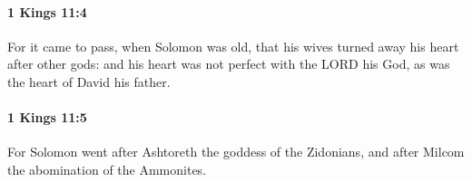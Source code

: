 		\paragraph{1 Kings 11:4} %
			\label{1KINGS-11-4}

			For it came to pass, when Solomon was old, that his wives turned away his heart after other gods: and his heart was not perfect with the LORD his God, as was the heart of David his father.


		\paragraph{1 Kings 11:5} %
			\label{1KINGS-11-5}

			For Solomon went after Ashtoreth the goddess of the Zidonians, and after Milcom the abomination of the Ammonites.


